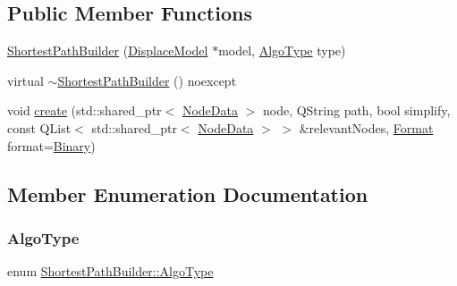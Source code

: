 \subsection*{Public Member Functions}
\begin{DoxyCompactItemize}
\item 
\mbox{\hyperlink{class_shortest_path_builder_a1f2ab2e63d5d8c2611fbb348039d0648}{Shortest\+Path\+Builder}} (\mbox{\hyperlink{class_displace_model}{Displace\+Model}} $\ast$model, \mbox{\hyperlink{class_shortest_path_builder_a1ba5dda0ad139bf12f34e1eb552bcb13}{Algo\+Type}} type)
\item 
virtual \mbox{\hyperlink{class_shortest_path_builder_a0e231e5bfd3fce5e5ee9c33458673ba9}{$\sim$\+Shortest\+Path\+Builder}} () noexcept
\item 
void \mbox{\hyperlink{class_shortest_path_builder_a9b6bae6c671b09614e31e10da8083786}{create}} (std\+::shared\+\_\+ptr$<$ \mbox{\hyperlink{class_node_data}{Node\+Data}} $>$ node, Q\+String path, bool simplify, const Q\+List$<$ std\+::shared\+\_\+ptr$<$ \mbox{\hyperlink{class_node_data}{Node\+Data}} $>$ $>$ \&relevant\+Nodes, \mbox{\hyperlink{class_shortest_path_builder_afd1e54ec63b4266aed503c6fb3bb7a73}{Format}} format=\mbox{\hyperlink{class_shortest_path_builder_afd1e54ec63b4266aed503c6fb3bb7a73adfe54cf287abea5248d8b43f1cde7860}{Binary}})
\end{DoxyCompactItemize}


\subsection{Member Enumeration Documentation}
\mbox{\label{class_shortest_path_builder_a1ba5dda0ad139bf12f34e1eb552bcb13}} 
\subsubsection{\texorpdfstring{AlgoType}{AlgoType}}
{\footnotesize\ttfamily enum \mbox{\hyperlink{class_shortest_path_builder_a1ba5dda0ad139bf12f34e1eb552bcb13}{Shortest\+Path\+Builder\+::\+Algo\+Type}}\hspace{0.3cm}{\ttfamily [strong]}}

